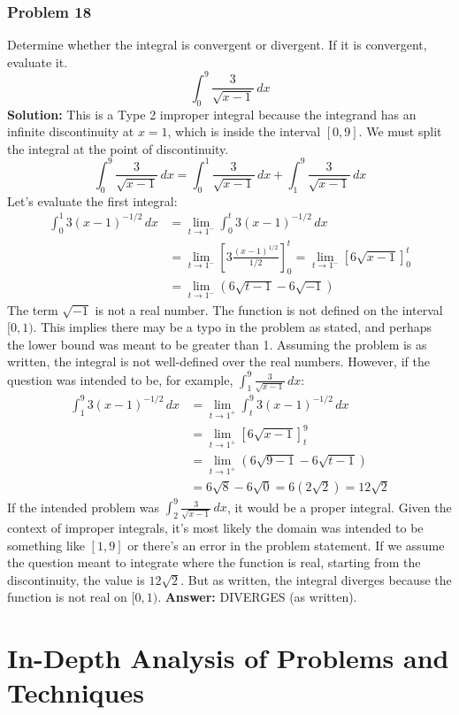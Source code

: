\documentclass{article}
\begin{document}
\section{Problem 18}
Determine whether the integral is convergent or divergent. If it is convergent, evaluate it.
\[ \int_{0}^{9} \frac{3}{\sqrt{x-1}} \,dx \]
\textbf{Solution:}
This is a Type 2 improper integral because the integrand has an infinite discontinuity at $x=1$, which is inside the interval $[0, 9]$. We must split the integral at the point of discontinuity.
\[ \int_{0}^{9} \frac{3}{\sqrt{x-1}} \,dx = \int_{0}^{1} \frac{3}{\sqrt{x-1}} \,dx + \int_{1}^{9} \frac{3}{\sqrt{x-1}} \,dx \]
Let's evaluate the first integral:
\begin{align*}
    \int_{0}^{1} 3(x-1)^{-1/2} \,dx &= \lim_{t \to 1^{-}} \int_{0}^{t} 3(x-1)^{-1/2} \,dx \\
    &= \lim_{t \to 1^{-}} \left[ 3 \frac{(x-1)^{1/2}}{1/2} \right]_{0}^{t} = \lim_{t \to 1^{-}} [6\sqrt{x-1}]_0^t \\
    &= \lim_{t \to 1^{-}} (6\sqrt{t-1} - 6\sqrt{-1})
\end{align*}
The term $\sqrt{-1}$ is not a real number. The function is not defined on the interval $[0, 1)$. This implies there may be a typo in the problem as stated, and perhaps the lower bound was meant to be greater than 1. Assuming the problem is as written, the integral is not well-defined over the real numbers.
However, if the question was intended to be, for example, $\int_{1}^{9} \frac{3}{\sqrt{x-1}} \,dx$:
\begin{align*}
    \int_{1}^{9} 3(x-1)^{-1/2} \,dx &= \lim_{t \to 1^{+}} \int_{t}^{9} 3(x-1)^{-1/2} \,dx \\
    &= \lim_{t \to 1^{+}} [6\sqrt{x-1}]_t^9 \\
    &= \lim_{t \to 1^{+}} (6\sqrt{9-1} - 6\sqrt{t-1}) \\
    &= 6\sqrt{8} - 6\sqrt{0} = 6(2\sqrt{2}) = 12\sqrt{2}
\end{align*}
If the intended problem was $\int_{2}^{9} \frac{3}{\sqrt{x-1}} \,dx$, it would be a proper integral. Given the context of improper integrals, it's most likely the domain was intended to be something like $[1, 9]$ or there's an error in the problem statement. If we assume the question meant to integrate where the function is real, starting from the discontinuity, the value is $12\sqrt{2}$. But as written, the integral diverges because the function is not real on $[0,1)$.
\textbf{Answer:} DIVERGES (as written).

\part{In-Depth Analysis of Problems and Techniques}
\end{document}
